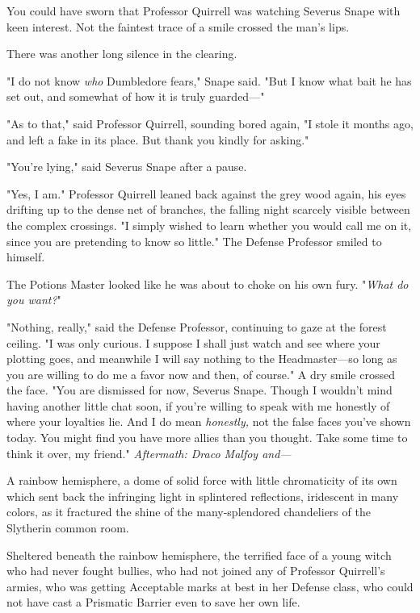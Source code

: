 You could have sworn that Professor Quirrell was watching Severus Snape with 
keen interest. Not the faintest trace of a smile crossed the man's lips.

There was another long silence in the clearing.

"I do not know \emph{who} Dumbledore fears," Snape said. "But I know what bait 
he has set out, and somewhat of how it is truly guarded---"

"As to that," said Professor Quirrell, sounding bored again, "I stole it months 
ago, and left a fake in its place. But thank you kindly for asking."

"You're lying," said Severus Snape after a pause.

"Yes, I am." Professor Quirrell leaned back against the grey wood again, his 
eyes drifting up to the dense net of branches, the falling night scarcely 
visible between the complex crossings. "I simply wished to learn whether you 
would call me on it, since you are pretending to know so little." The Defense 
Professor smiled to himself.

The Potions Master looked like he was about to choke on his own fury. 
"\emph{What do you want?}"

"Nothing, really," said the Defense Professor, continuing to gaze at the forest 
ceiling. "I was only curious. I suppose I shall just watch and see where your 
plotting goes, and meanwhile I will say nothing to the Headmaster---so long as 
you are willing to do me a favor now and then, of course." A dry smile crossed 
the face. "You are dismissed for now, Severus Snape. Though I wouldn't mind 
having another little chat soon, if you're willing to speak with me honestly of 
where your loyalties lie. And I do mean \emph{honestly,} not the false faces 
you've shown today. You might find you have more allies than you thought. Take 
some time to think it over, my friend."
\sbreak
\emph{Aftermath: Draco Malfoy and---}

A rainbow hemisphere, a dome of solid force with little chromaticity of its own 
which sent back the infringing light in splintered reflections, iridescent in 
many colors, as it fractured the shine of the many-splendored chandeliers of 
the Slytherin common room.

Sheltered beneath the rainbow hemisphere, the terrified face of a young witch 
who had never fought bullies, who had not joined any of Professor Quirrell's 
armies, who was getting Acceptable marks at best in her Defense class, who 
could not have cast a Prismatic Barrier even to save her own life.

